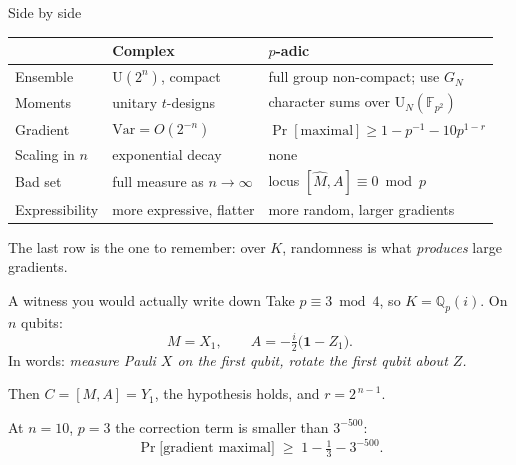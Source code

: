 \documentclass[aspectratio=169,10pt]{beamer}
\newcommand{\Qp}{\mathbb{Q}_p}
\newcommand{\FF}{\mathbb{F}}
\newcommand{\Uni}{\mathrm{U}}
\newcommand{\Id}{\mathbf{1}}
\begin{document}
\begin{frame}{Side by side}
  \begin{center}
  \small
  \begin{tabular}{@{}lll@{}}
    \toprule
     & \textbf{Complex} & \textbf{$p$-adic} \\
    \midrule
    Ensemble        & $\Uni(2^{n})$, compact      & full group non-compact; use $G_N$ \\
    Moments         & unitary $t$-designs         & character sums over $\Uni_N(\FF_{p^2})$ \\
    Gradient        & $\mathrm{Var}=O(2^{-n})$    & $\Pr[\text{maximal}]\ge1-p^{-1}-10p^{1-r}$ \\
    Scaling in $n$  & exponential decay           & none \\
    Bad set         & full measure as $n\to\infty$& locus $[\widehat M,A]\equiv0 \bmod p$ \\
    Expressibility  & more expressive, flatter    & more random, \alert{larger} gradients \\
    \bottomrule
  \end{tabular}
  \end{center}

  \vspace{0.6em}
  The last row is the one to remember: over $K$, randomness is what
  \emph{produces} large gradients.
\end{frame}

\begin{frame}{A witness you would actually write down}
  Take $p\equiv3\bmod4$, so $K=\Qp(i)$. On $n$ qubits:
  \[
    M=X_1,
    \qquad
    A=-\tfrac{i}{2}\bigl(\Id-Z_1\bigr) .
  \]
  In words: \emph{measure Pauli $X$ on the first qubit, rotate the first qubit
  about $Z$.}

  \vspace{0.5em}
  Then $C=[M,A]=Y_1$, the hypothesis holds, and
  $r=2^{\,n-1}$.

  \vspace{0.5em}
  At $n=10$, $p=3$ the correction term is smaller than $3^{-500}$:
  \[
    \Pr\bigl[\text{gradient maximal}\bigr]\;\ge\;1-\tfrac13-3^{-500}.
  \]
\end{frame}
\end{document}
